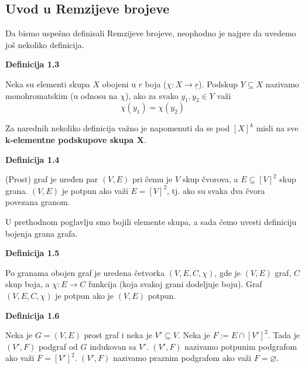 \documentclass[12pt,a4paper]{article}
\begin{document}
	\newpage
	\subsection{Uvod u Remzijeve brojeve}
	\vspace{1.5em}
	
	Da bismo uspešno definisali Remzijeve brojeve, neophodno je najpre da uvedemo još nekoliko definicija.

	\begin{mdframed}
	{\noindent\fontsize{12pt}{12pt}\textbf{Definicija 1.3}}
	\vspace{0.5em}

	\noindent Neka su elementi skupa $X$ obojeni u $r$ boja ($\chi : X \rightarrow \underline{r}$). Podskup $Y \subseteq X$ nazivamo monohromatskim (u odnosu na $\chi$), ako za svako $y_1, y_2 \in Y$ važi
	\[\chi(y_1) = \chi(y_2)\]
	\end{mdframed}
	\vspace{0.5em}
	
	\noindent Za narednih nekoliko definicija važno je napomenuti da se pod $[X]^{k}$ misli na sve \\ \textbf{$\textbf{k}$-elementne podskupove skupa $\textbf{X}$}.

	\begin{mdframed}
	{\noindent\fontsize{12pt}{12pt}\textbf{Definicija 1.4}}
	\vspace{0.5em}

	\noindent (Prost) graf je uređen par $(V, E)$ pri čemu je $V$ skup čvorova, a $E \subseteq [V]^{2}$ skup grana.
	$(V, E)$ je potpun ako važi $E = [V]^{2}$, tj. ako su svaka dva čvora povezana granom.
	\end{mdframed}
	\vspace{0.5em}
	
	\noindent U prethodnom poglavlju smo bojili elemente skupa, a sada ćemo uvesti definiciju bojenja grana grafa.
	\begin{mdframed}
	{\noindent\fontsize{12pt}{12pt}\textbf{Definicija 1.5}}
	\vspace{0.5em}

	\noindent Po granama obojen graf je uredena četvorka $(V, E, C, \chi)$, gde je $(V, E)$ graf, $C$ skup boja,
	a $\chi : E \rightarrow C$ funkcija (koja svakoj grani dodeljuje boju). Graf
	$(V, E, C, \chi)$ je potpun ako je $(V, E)$ potpun.
	\end{mdframed}
	\vspace{0.5em}
	\begin{mdframed}
	{\noindent\fontsize{12pt}{12pt}\textbf{Definicija 1.6}}
	\vspace{0.5em}

	\noindent Neka je $G = (V, E)$ prost graf i neka je $V' \subseteq V$. Neka je $F := E \cap [V']^{2}$. 
	Tada je $(V' , F)$	podgraf od $G$ indukovan sa $V'$.
	$(V', F)$ nazivamo potpunim podgrafom ako važi $F = [V']^{2}$.
	$(V', F)$ nazivamo praznim podgrafom ako važi $F = \varnothing$.
	\end{mdframed}
	\vspace{0.5em}
\end{document}
